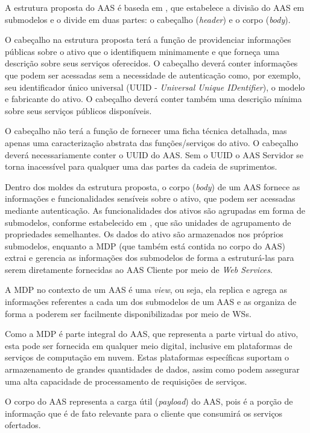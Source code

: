 	A estrutura proposta do AAS é baseda em , que estabelece a divisão do AAS em submodelos e o divide em duas partes: o cabeçalho (\textit{header}) e o corpo (\textit{body}).
	
	O cabeçalho na estrutura proposta terá a função de providenciar informações públicas sobre o ativo que o identifiquem minimamente e que forneça uma descrição sobre seus serviços oferecidos. O cabeçalho deverá conter informações que podem ser acessadas sem a necessidade de autenticação como, por exemplo, seu identificador único universal (UUID - \textit{Universal Unique IDentifier}), o modelo e fabricante do ativo. O cabeçalho deverá conter também uma descrição mínima sobre seus serviços públicos disponíveis.
	
	O cabeçalho não terá a função de fornecer uma ficha técnica detalhada, mas apenas uma caracterização abstrata das funções/serviços do ativo. O cabeçalho deverá necessariamente conter o UUID do AAS. Sem o UUID o AAS Servidor se torna inacessível para qualquer uma das partes da cadeia de suprimentos.
	
	Dentro dos moldes da estrutura proposta, o corpo (\textit{body}) de um AAS fornece as informações e funcionalidades sensíveis sobre o ativo, que podem ser acessadas mediante autenticação. As funcionalidades dos ativos são agrupadas em forma de submodelos, conforme estabelecido em , que são unidades de agrupamento de propriedades semelhantes. Os dados do ativo são armazenados nos próprios submodelos, enquanto a MDP (que também está contida no corpo do AAS) extrai e gerencia as informações dos submodelos de forma a estruturá-las para serem diretamente fornecidas ao AAS Cliente por meio de \textit{Web Services}.
	
	A MDP no contexto de um AAS é uma \textit{view}, ou seja, ela replica e agrega as informações referentes a cada um dos submodelos de um AAS e as organiza de forma a poderem ser facilmente disponibilizadas por meio de WSs.
	
	Como a MDP é parte integral do AAS, que representa a parte virtual do ativo, esta pode ser fornecida em qualquer meio digital, inclusive em plataformas de serviços de computação em nuvem. Estas plataformas específicas suportam o armazenamento de grandes quantidades de dados, assim como podem assegurar uma alta capacidade de processamento de requisições de serviços.
	
	O corpo do AAS representa a carga útil (\textit{payload}) do AAS, pois é a porção de informação que é de fato relevante para o cliente que consumirá os serviços ofertados.
	

